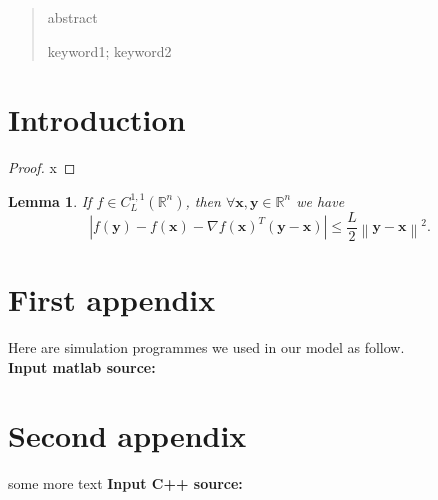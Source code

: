 \documentclass{mcmthesis}
\title{}
\newcommand{\rmnum}[1]{\romannumeral #1}
\begin{document}
\begin{abstract}
abstract
\begin{keywords}
keyword1; keyword2
\end{keywords}
\end{abstract}
\maketitle


\tableofcontents
\pagestyle{fancy} 
\rhead{\small\sffamily  \rmnum{\thepage}}
\newpage
\pagestyle{fancy}
\setcounter{page}{1}

\section{Introduction}


\cite{PEISHI1989297}

\cite{timmurphy.org}






\begin{appendices}

\begin{proof}   %
  x
\end{proof}

\newtheorem{lemma}{Lemma}%
\begin{lemma}  
If $f\in C_{L}^{1,1}(\mathbb{R}^{n})$, then $\forall \textbf{x},\textbf{y}\in\mathbb{R}^{n}$ we have  
\begin{equation}  
\left|{f(\textbf{y})-f(\textbf{x})-\nabla f(\textbf{x})^{T}(\textbf{y}-\textbf{x})}\right|\le\frac{L}{2}\left\|{\textbf{y}-\textbf{x}}\right\|^{2}.  
\end{equation}  
\end{lemma} 
\section{First appendix}

\lipsum[13]

Here are simulation programmes we used in our model as follow.\\

\textbf{\textcolor[rgb]{0.98,0.00,0.00}{Input matlab source:}}


\section{Second appendix}

some more text \textcolor[rgb]{0.98,0.00,0.00}{\textbf{Input C++ source:}}


\end{appendices}
\end{document}
